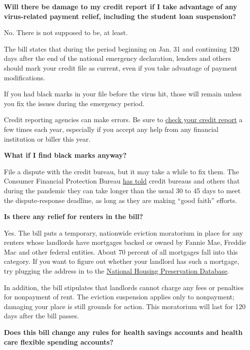 \textbf{Will there be damage to my credit report if I take advantage of
any virus-related payment relief, including the student loan
suspension?}

No. There is not supposed to be, at least.

The bill states that during the period beginning on Jan. 31 and
continuing 120 days after the end of the national emergency declaration,
lenders and others should mark your credit file as current, even if you
take advantage of payment modifications.

If you had black marks in your file before the virus hit, those will
remain unless you fix the issues during the emergency period.

Credit reporting agencies can make errors. Be sure to
\href{https://www.annualcreditreport.com/index.action}{check your credit
report} a few times each year, especially if you accept any help from
any financial institution or biller this year.

\textbf{What if I find black marks anyway?}

File a dispute with the credit bureau, but it may take a while to fix
them. The Consumer Financial Protection Bureau
\href{https://files.consumerfinance.gov/f/documents/cfpb_credit-reporting-policy-statement_cares-act_2020-04.pdf}{has
told} credit bureaus and others that during the pandemic they can take
longer than the usual 30 to 45 days to meet the dispute-response
deadline, as long as they are making ``good faith'' efforts.

\textbf{Is there any relief for renters in the bill?}

Yes. The bill puts a temporary, nationwide eviction moratorium in place
for any renters whose landlords have mortgages backed or owned by Fannie
Mae, Freddie Mac and other federal entities. About 70 percent of all
mortgages fall into this category. If you want to figure out whether
your landlord has such a mortgage, try plugging the address in to the
\href{https://preservationdatabase.org/about-the-database/}{National
Housing Preservation Database}.

In addition, the bill stipulates that landlords cannot charge any fees
or penalties for nonpayment of rent. The eviction suspension applies
only to nonpayment; damaging your place is still grounds for action.
This moratorium will last for 120 days after the bill passes.

\textbf{Does this bill change any rules for health savings accounts and
health care flexible spending accounts?}

